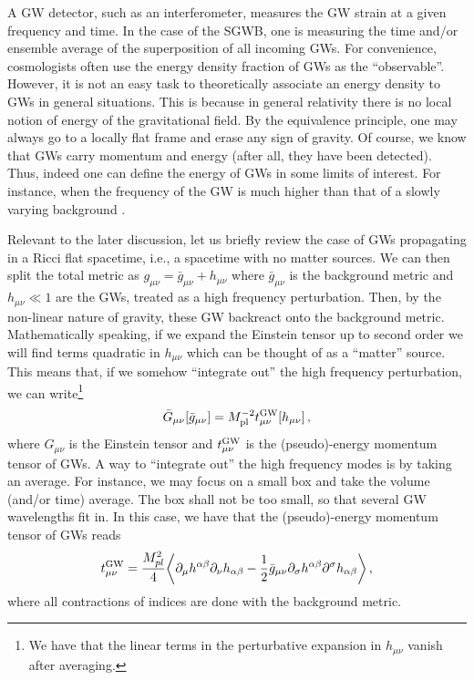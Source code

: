 \documentclass[a4paper,11pt]{article}
\numberwithin{equation}{section}
\begin{document}
A GW detector, such as an interferometer, measures the GW strain at a given frequency and time. In the case of the SGWB, one is measuring the time and/or ensemble average of the superposition of all incoming GWs. For convenience, cosmologists often use the energy density fraction of GWs as the ``observable''. However, it is not an easy task to theoretically associate an energy density to GWs in general situations. This is because in general relativity there is no local notion of energy of the gravitational field. By the equivalence principle, one may always go to a locally flat frame and erase any sign of gravity. Of course, we know that GWs carry momentum and energy (after all, they have been detected). Thus, indeed one can define the energy of GWs in some limits of interest. For instance, when the frequency of the GW is much higher than that of a slowly varying background \cite{Maggiore:1900zz}. 


Relevant to the later discussion, let us briefly review the case of GWs propagating in a Ricci flat spacetime, i.e., a spacetime with no matter sources. We can then split the total metric as $g_{\mu\nu}=\bar g_{\mu\nu}+h_{\mu\nu}$ where $\bar g_{\mu\nu}$ is the background metric and $h_{\mu\nu}\ll1$ are the GWs, treated as a high frequency perturbation. Then, by the non-linear nature of gravity, these GW backreact onto the background metric. Mathematically speaking, if we expand the Einstein tensor up to second order we will find terms quadratic in $h_{\mu\nu}$ which can be thought of as a ``matter'' source. This means that, if we somehow ``integrate out'' the high frequency perturbation, we can write\footnote{We have that the linear terms in the perturbative expansion in $h_{\mu\nu}$ vanish after averaging.}
\begin{equation}
\bar G_{\mu\nu}[\bar g_{\mu\nu}]={M_{\rm pl}^{-2}}t_{\mu\nu}^{\rm GW}[h_{\mu\nu}]\,,
\end{equation}
where $G_{\mu\nu}$ is the Einstein tensor and $t_{\mu\nu}^{\rm GW}$ is the (pseudo)-energy momentum tensor of GWs. A way to ``integrate out'' the high frequency modes is by taking an average. For instance, we may focus on a small box and take the volume (and/or time) average. The box shall not be too small, so that several GW wavelengths fit in. In this case, we have that the (pseudo)-energy momentum tensor of GWs reads \cite{Isaacson:1967zz,Isaacson:1968zza}
\begin{equation}\label{eq:pseudotensor}
t_{\mu\nu}^{\rm GW}=\frac{M_{pl}^2}{4}\bigg\langle\partial_\mu h^{\alpha\beta}\partial_\nu h_{\alpha\beta}-\frac{1}{2}\bar g_{\mu\nu}\partial_\sigma h^{\alpha\beta}\partial^\sigma h_{\alpha\beta}\bigg\rangle\,,
\end{equation}
where all contractions of indices are done with the background metric.
\end{document}
